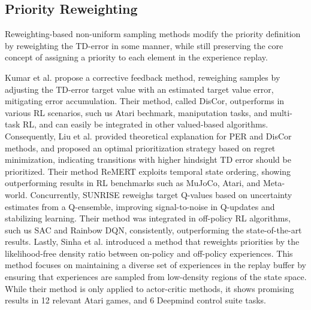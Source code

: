 



\subsection{Priority Reweighting}

Reweighting-based non-uniform sampling methods modify the priority definition by reweighting the TD-error in some manner, while still preserving the core concept of assigning a priority to each element in the experience replay.

Kumar et al. \cite{kumar2020discor} propose a corrective feedback method, reweighing samples by adjusting the TD-error target value with an estimated target value error, mitigating error accumulation. Their method, called DisCor, outperforms in various RL scenarios, such us Atari bechmark, maniputation tasks, and multi-task RL, and can easily be integrated in other valued-based algorithms. Consequently, Liu et al. \cite{liu2021regret} provided theoretical explanation for PER and DisCor methods, and proposed an optimal prioritization strategy based on regret minimization, indicating transitions with higher hindsight TD error should be prioritized. Their method ReMERT exploits temporal state ordering, showing outperforming results in RL benchmarks such as MuJoCo, Atari, and Meta-world. Concurrently, SUNRISE \cite{lee2021sunrise} reweighs target Q-values based on uncertainty estimates from a Q-ensemble, improving signal-to-noise in Q-updates and stabilizing learning. Their method was integrated in off-policy RL algorithms, such us SAC and Rainbow DQN, consistently, outperforming the state-of-the-art results. Lastly, Sinha et al. \cite{sinha2022experience} introduced a method that reweights priorities by the likelihood-free density ratio between on-policy and off-policy experiences. This method focuses on maintaining a diverse set of experiences in the replay buffer by ensuring that experiences are sampled from low-density regions of the state space. While their method is only applied to actor-critic methods, it shows promising results in 12 relevant Atari games, and 6 Deepmind control suite tasks.

